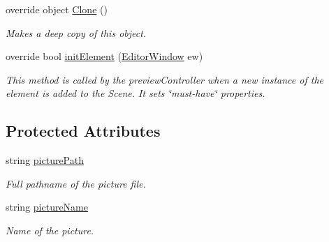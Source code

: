 \begin{DoxyCompactItemize}
override object \hyperlink{class_a_rdev_kit_1_1_model_1_1_project_1_1_picture_marker_a090e0af9c7cdd270248516fe645b345d}{Clone} ()
\begin{DoxyCompactList}\small\item\em Makes a deep copy of this object. \end{DoxyCompactList}\item 
override bool \hyperlink{class_a_rdev_kit_1_1_model_1_1_project_1_1_picture_marker_a4563d08f550a2bde05cc86ba49a30756}{init\-Element} (\hyperlink{class_a_rdev_kit_1_1_editor_window}{Editor\-Window} ew)
\begin{DoxyCompactList}\small\item\em This method is called by the preview\-Controller when a new instance of the element is added to the Scene. It sets \char`\"{}must-\/have\char`\"{} properties. \end{DoxyCompactList}\end{DoxyCompactItemize}
\subsection*{Protected Attributes}
\begin{DoxyCompactItemize}
\item 
string \hyperlink{class_a_rdev_kit_1_1_model_1_1_project_1_1_picture_marker_a35143cb6b2a6724b1fce695cdeac06e9}{picture\-Path}
\begin{DoxyCompactList}\small\item\em Full pathname of the picture file. \end{DoxyCompactList}\item 
string \hyperlink{class_a_rdev_kit_1_1_model_1_1_project_1_1_picture_marker_a1f697f11716f6f14539bb3b368c38742}{picture\-Name}
\begin{DoxyCompactList}\small\item\em Name of the picture. \end{DoxyCompactList}\end{DoxyCompactItemize}
